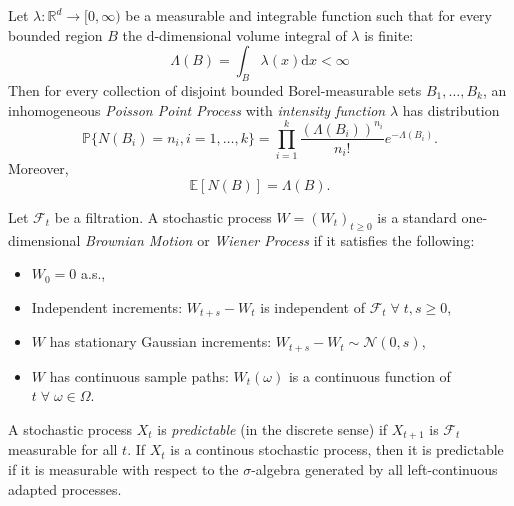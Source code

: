 \begin{definition}
    Let $\lambda:\mathbb{R}^d\rightarrow[0,\infty)$ be a measurable and
    integrable function such that for every bounded region $B$ the d-dimensional
    volume integral of $\lambda$ is finite:
    \begin{equation}
        \Lambda(B)=\int_B\lambda(x)\mathrm dx<\infty
    \end{equation}
    Then for every collection of disjoint bounded Borel-measurable sets
    $B_1,\dots,B_k$, an inhomogeneous \emph{Poisson Point Process} with
    \emph{intensity function} $\lambda$ has distribution
    \begin{equation}
        \mathbb{P}\{N(B_i)=n_i,i=1,\dots,k\}=\prod_{i=1}^k\frac{(\Lambda(B_i))^{n_i}}{n_i!}e^{-\Lambda(B_i)}.
    \end{equation}
    Moreover,
    \begin{equation}
        \mathbb{E}[N(B)]=\Lambda(B).
    \end{equation}
\end{definition}

\begin{definition}
    Let $\mathcal{F}_t$ be a filtration. A stochastic process $W=(W_t)_{t\geq0}$
    is a standard one-dimensional \emph{Brownian Motion} or \emph{Wiener Process}
    if it satisfies the following:
    \begin{itemize}
        \item $W_0=0$ a.s.,
        \item Independent increments: $W_{t+s}-W_t$ is independent of $\mathcal{F}_t\;\forall\;t,s\geq0$,
        \item $W$ has stationary Gaussian increments: $W_{t+s}-W_t\sim\mathcal{N}(0,s)$,
        \item $W$ has continuous sample paths: $W_t(\omega)$ is a continuous function of $t\;\forall\;\omega\in\Omega$.
    \end{itemize}
\end{definition}

\begin{definition}
    A stochastic process $X_t$ is \emph{predictable} (in the discrete sense) 
    if $X_{t+1}$ is $\mathcal{F}_{t}$ measurable for all $t$. If $X_t$
    is a continous stochastic process, then it is predictable if it is 
    measurable with respect to the $\sigma$-algebra generated by all left-continuous
    adapted processes.
\end{definition}

